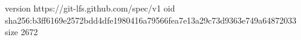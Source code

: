 version https://git-lfs.github.com/spec/v1
oid sha256:b3ff6169e2572bdd4dfe1980416a79566fea7e13a29c73d9363e749a64872033
size 2672
